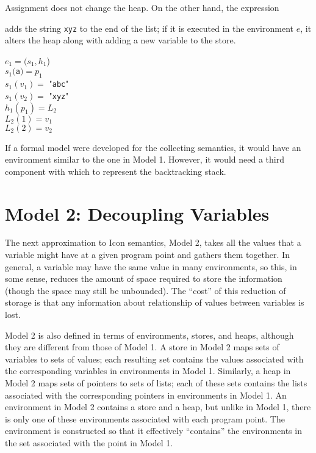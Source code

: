 \noindent
Assignment does not change the heap. On the other hand, the expression 


\noindent adds the string \texttt{xyz} to the end of the list; if it is
executed in the environment $e$, it alters the heap along with adding a
new variable to the store.

\goodbreak
\begin{specialcode}{}
\>$e_1 = (s_1 , h_1$)\\
\>$s_1($\texttt{a}$) = p_1$\\
\>$s_1(v_1) =$ "\texttt{abc}"\\
\>$s_1(v_2) =$ "\texttt{xyz}"\\
\>$h_1(p_1) = L_2$\\
\>$L_2(1) = v_1$\\
\>$L_2(2) = v_2$\\
\end{specialcode}


If a formal model were developed for the collecting semantics, it
would have an environment similar to the one in Model 1. However, it
would need a third component with which to represent the backtracking
stack.

\section*{Model 2: Decoupling Variables}

The next approximation to Icon semantics, Model 2, takes all the
values that a variable might have at a given program point and gathers
them together. In general, a variable may have the same value in many
environments, so this, in some sense, reduces the amount of space
required to store the information (though the space may still be
unbounded). The ``cost'' of this reduction of storage is that any
information about relationship of values between variables is lost.

Model 2 is also defined in terms of environments, stores, and heaps,
although they are different from those of Model 1.  A store in Model 2
maps sets of variables to sets of values; each resulting set contains
the values associated with the corresponding variables in environments
in Model 1. Similarly, a heap in Model 2 maps sets of pointers to sets
of lists; each of these sets contains the lists associated with the
corresponding pointers in environments in Model 1. An environment in
Model 2 contains a store and a heap, but unlike in Model 1, there is
only one of these environments associated with each program point. The
environment is constructed so that it effectively ``contains'' the
environments in the set associated with the point in Model 1.

